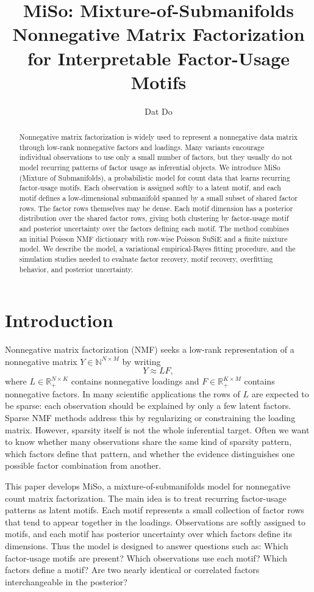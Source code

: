 \documentclass[11pt]{article}
\title{MiSo: Mixture-of-Submanifolds Nonnegative Matrix Factorization for Interpretable Factor-Usage Motifs}
\author{Dat Do}
\date{}
\newcommand{\N}{\mathbb{N}}
\newcommand{\R}{\mathbb{R}}
\theoremstyle{plain}
\theoremstyle{definition}
\begin{document}
\maketitle

\begin{abstract}
Nonnegative matrix factorization is widely used to represent a nonnegative data
matrix through low-rank nonnegative factors and loadings. Many variants
encourage individual observations to use only a small number of factors, but
they usually do not model recurring patterns of factor usage as inferential
objects. We introduce MiSo (Mixture of Submanifolds), a probabilistic model for
count data that learns recurring factor-usage motifs. Each observation is
assigned softly to a latent motif, and each motif defines a low-dimensional
submanifold spanned by a small subset of shared factor rows. The factor rows
themselves may be dense. Each motif dimension has a posterior distribution over
the shared factor rows, giving both clustering by factor-usage motif and
posterior uncertainty over the factors defining each motif. The method combines
an initial Poisson NMF dictionary with row-wise Poisson SuSiE and a finite
mixture model. We describe the model, a variational empirical-Bayes fitting
procedure, and the simulation studies needed to evaluate factor recovery,
motif recovery, overfitting behavior, and posterior uncertainty.
\end{abstract}

\section{Introduction}

Nonnegative matrix factorization (NMF) seeks a low-rank representation of a
nonnegative matrix $Y \in \N^{N \times M}$ by writing
\[
  Y \approx L F,
\]
where $L \in \R_+^{N \times K}$ contains nonnegative loadings and
$F \in \R_+^{K \times M}$ contains nonnegative factors. In many scientific
applications the rows of $L$ are expected to be sparse: each observation should
be explained by only a few latent factors. Sparse NMF methods address this by
regularizing or constraining the loading matrix. However, sparsity itself is not
the whole inferential target. Often we want to know whether many observations
share the same kind of sparsity pattern, which factors define that pattern, and
whether the evidence distinguishes one possible factor combination from another.

This paper develops MiSo, a mixture-of-submanifolds model for nonnegative count
matrix factorization. The main idea is to treat recurring factor-usage patterns
as latent motifs. Each motif represents a small collection of factor
rows that tend to appear together in the loadings. Observations are softly
assigned to motifs, and each motif has posterior uncertainty over which factors
define its dimensions. Thus the model is designed to answer questions such as:
Which factor-usage motifs are present? Which observations use each motif? Which
factors define a motif? Are two nearly identical or correlated factors
interchangeable in the posterior?
\end{document}

